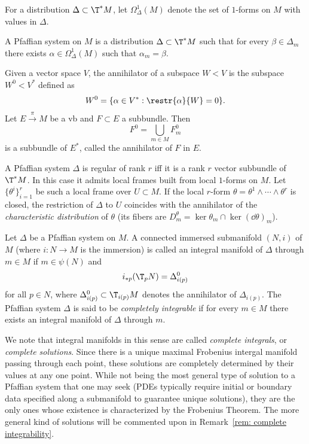 For a distribution $\Delta\subset \T^\ast M$, let $\Omega^1_\Delta(M)$ denote the set of $1$-forms on $M$ with values in $\Delta$.

\begin{defn}
    A Pfaffian system on $M$ is a distribution $\Delta\subset \T^\ast M$ such that for every $\beta\in\Delta_m$ there exists $\alpha\in\Omega^1_\Delta(M)$ such that $\alpha_m=\beta$.
\end{defn}

\begin{defn}[Annihilator]
    Given a vector space $V$, the annihilator of a subspace $W<V$ is the subspace $W^0<V^\ast$ defined as
    \[W^0=\{\alpha\in V^\ast: \restr{\alpha}{W}=0 \}.\]
    Let $E\overset{\pi}{\to}M$ be a \gls{vb} and $F\subset E$ a subbundle. Then
    \[F^0=\bigcup_{m\in M}F_m^0\]
    is a subbundle of $E^\ast$, called the annihilator of $F$ in $E$.
\end{defn}


\begin{rem}
    A Pfaffian system $\Delta$ is regular of rank $r$ iff it is a rank $r$ vector subbundle of $\T^\ast M$. In this case it admits local frames built from local $1$-forms on $M$. Let $\{\theta^i\}_{i=1}^r$ be such a local frame over $U\subset M$. If the local $r$-form $\theta=\theta^1\wedge\cdots\wedge\theta^r$ is closed, the restriction of $\Delta$ to $U$ coincides with the annihilator of the \emph{characteristic distribution} of $\theta$ (its fibers are $D^\theta_m=\ker\theta_m\cap \ker(\dd\theta)_m$).
\end{rem}

\begin{defn}
    Let $\Delta$ be a Pfaffian system on $M$. A connected immersed submanifold $(N,i)$ of $M$ (where $i:N\to M$ is the immersion) is called an integral manifold of $\Delta$ through $m\in M$ if $m\in\psi(N)$ and 
    \[i_{\ast p}(\T_pN)=\Delta_{i(p)}^0\]
    for all $p\in N$, where $\Delta_{i(p)}^0\subset \T_{i(p)}M$ denotes the annihilator of $\Delta_{i(p)}$. The Pfaffian system $\Delta$ is said to be \emph{completely integrable} if for every $m\in M$ there exists an integral manifold of $\Delta$ through $m$.
\end{defn}

We note that integral manifolds in this sense are called \emph{complete integrals}, or \emph{complete solutions}. Since there is a unique maximal Frobenius intergal manifold passing through each point, these solutions are completely determined by their values at any one point. While not being the most general type of solution to a Pfaffian system that one may seek (PDEs typically require initial or boundary data specified along a submanifold to guarantee unique solutions), they are the only ones whose existence is characterized by the Frobenius Theorem. The more general kind of solutions will be commented upon in Remark~\ref{rem: complete integrability}.

